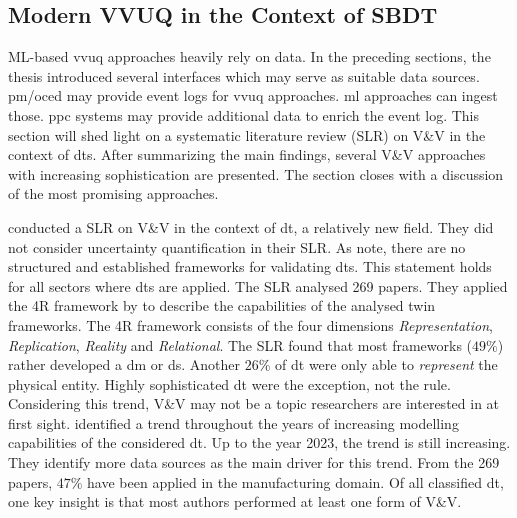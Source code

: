 \subsection{Modern VVUQ in the Context of SBDT}
\label{sec:vvuq-dt}
ML-based \gls{vvuq} approaches heavily rely on data. In the preceding sections, the thesis introduced several interfaces which may serve as suitable data sources. \gls{pm}/\gls{oced} may provide event logs for \gls{vvuq} approaches. \gls{ml} approaches can ingest those. \gls{ppc} systems may provide additional data to enrich the event log. This section will shed light on a systematic literature review (SLR) on V\&V in the context of \gls{dt}s. After summarizing the main findings, several V\&V approaches with increasing sophistication are presented. The section closes with a discussion of the most promising approaches.

\Textcite{Bitencourt2023} conducted a SLR on V\&V in the context of \gls{dt}, a relatively new field. They did not consider uncertainty quantification in their SLR. As \textcite{hua2022validation} note, there are no structured and established frameworks for validating \gls{dt}s. This statement holds for all sectors where \gls{dt}s are applied. The SLR analysed 269 papers. They applied the 4R framework by \textcite{Osho2022jmsy} to describe the capabilities of the analysed twin frameworks. The 4R framework consists of the four dimensions \textit{Representation}, \textit{Replication}, \textit{Reality} and \textit{Relational}. The SLR found that most frameworks ($49\%$) rather developed a \gls{dm} or \gls{ds}. Another $26\%$ of \gls{dt} were only able to \textit{represent} the physical entity. Highly sophisticated \gls{dt} were the exception, not the rule. Considering this trend, V\&V may not be a topic researchers are interested in at first sight. \Textcite{Bitencourt2023} identified a trend throughout the years of increasing modelling capabilities of the considered \gls{dt}. Up to the year 2023, the trend is still increasing. They identify more data sources as the main driver for this trend. From the 269 papers, $47\%$ have been applied in the manufacturing domain. Of all classified \gls{dt}, one key insight is that most authors performed at least one form of V\&V.

